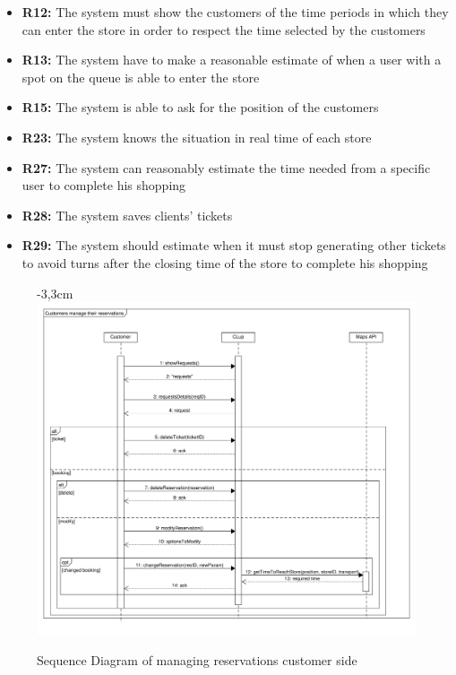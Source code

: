\documentclass{article}
\begin{document}
\begin{center}
\begin{itemize}
						\item {\bfseries R12: } The system must show the customers of the time periods in which they can
						enter the store in order to respect the time selected by the customers
						\item {\bfseries R13: } The system have to make a reasonable estimate of when a user with a spot
						on the queue is able to enter the store
						\item {\bfseries R15: } The system is able to ask for the position of the customers
						\item {\bfseries R23: } The system knows the situation in real time of each store
						\item {\bfseries R27: } The system can reasonably estimate the time needed from a specific user
						to complete his shopping
						\item {\bfseries R28: } The system saves clients' tickets
						
						\item {\bfseries R29: } The system should estimate when it must stop generating other tickets to
						avoid turns after the closing time of the store
						to complete his shopping

						
						
					\end{itemize}
				

				\end{center}
			\newpage
			\begin{figure}[!htb]
				\begin{adjustwidth} {-3,3cm}{}
					\centering
					\includegraphics[scale=0.5]{SD/10_manageReservation(customer).pdf}\\
					\caption{Sequence Diagram of managing reservations customer side}
				\end{adjustwidth}
			\end{figure}
		\newpage
		
\end{document}
